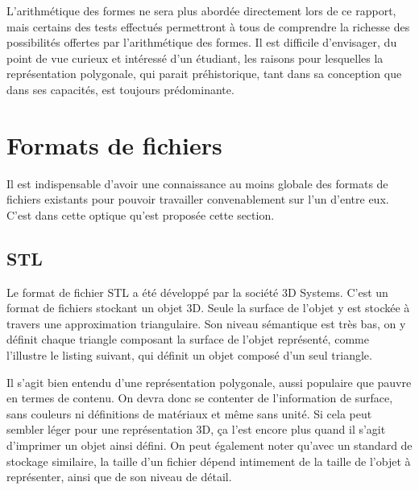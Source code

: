 \documentclass{tnreport}
\begin{document}
L'arithmétique des formes ne sera plus abordée directement lors de ce rapport, mais certains des tests effectués permettront à tous de comprendre la richesse des possibilités offertes par l'arithmétique des formes. Il est difficile d'envisager, du point de vue curieux et intéressé d'un étudiant, les raisons pour lesquelles la représentation polygonale, qui parait préhistorique, tant dans sa conception que dans ses capacités, est toujours prédominante.
\section{Formats de fichiers}
Il est indispensable d'avoir une connaissance au moins globale des formats de fichiers existants pour pouvoir travailler convenablement sur l'un d'entre eux. C'est dans cette optique qu'est proposée cette section. 
\subsection{STL}
Le format de fichier STL a été développé par la société 3D Systems. C'est un format de fichiers stockant un objet 3D. Seule la surface de l'objet y est stockée à travers une approximation triangulaire. Son niveau sémantique est très bas, on y définit chaque triangle composant la surface de l'objet représenté, comme l'illustre le listing suivant, qui définit un objet composé d'un seul triangle. 

Il s'agit bien entendu d'une représentation polygonale, aussi populaire que pauvre en termes de contenu. On devra donc se contenter de l'information de surface, sans couleurs ni définitions de matériaux et même sans unité. Si cela peut sembler léger pour une représentation 3D, ça l'est encore plus quand il s'agit d'imprimer un objet ainsi défini. On peut également noter qu'avec un standard de stockage similaire, la taille d'un fichier dépend intimement de la taille de l'objet à représenter, ainsi que de son niveau de détail. 
\newpage
\end{document}
